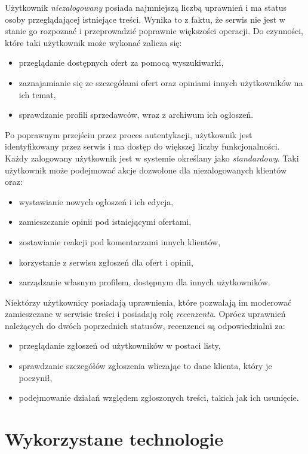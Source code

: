 Użytkownik \emph{niezalogowany} posiada najmniejszą liczbą uprawnień i ma status osoby przeglądającej istniejące treści.
Wynika to z faktu, że serwis nie jest w stanie go rozpoznać i przeprowadzić poprawnie większości operacji.
Do czynności, które taki użytkownik może wykonać zalicza się:
%
\begin{itemize}
    \item przeglądanie dostępnych ofert za pomocą wyszukiwarki,
    \item zaznajamianie się ze szczegółami ofert oraz opiniami innych użytkowników na ich temat,
    \item sprawdzanie profili sprzedawców, wraz z archiwum ich ogłoszeń.
\end{itemize}

Po poprawnym przejściu przez proces autentykacji, użytkownik jest identyfikowany przez serwis i ma dostęp do większej liczby funkcjonalności.
Każdy zalogowany użytkownik jest w systemie określany jako \emph{standardowy}.
Taki użytkownik może podejmować akcje dozwolone dla niezalogowanych klientów oraz:
%
\begin{itemize}
    \item wystawianie nowych ogłoszeń i ich edycja,
    \item zamieszczanie opinii pod istniejącymi ofertami,
    \item zostawianie reakcji pod komentarzami innych klientów,
    \item korzystanie z serwisu zgłoszeń dla ofert i opinii,
    \item zarządzanie własnym profilem, dostępnym dla innych użytkowników.
\end{itemize}

Niektórzy użytkownicy posiadają uprawnienia, które pozwalają im moderować zamieszczane w serwisie treści i posiadają rolę \emph{recenzenta}.
Oprócz uprawnień należących do dwóch poprzednich statusów, recenzenci są odpowiedzialni za:
%
\begin{itemize}
    \item przeglądanie zgłoszeń od użytkowników w postaci listy,
    \item sprawdzanie szczegółów zgłoszenia wliczając to dane klienta, który je poczynił,
    \item podejmowanie działań względem zgłoszonych treści, takich jak ich usunięcie.
\end{itemize}

\section{Wykorzystane technologie}

